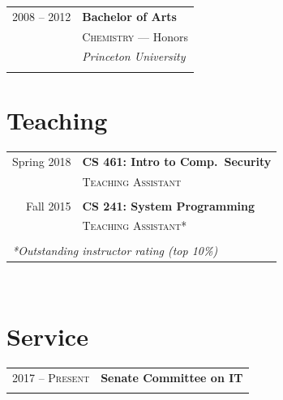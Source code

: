 \documentclass[10pt]{article} %
\begin{document}
{\begin{minipage}[t]{0.44\textwidth}
\begin{tabular}{rl}

2008 -- 2012 & \textbf{Bachelor of Arts} \\ 
& \textsc{Chemistry} --- \small{Honors} \\ 
& \textit{Princeton University}\\
&\\
	  
\end{tabular}


\section{Teaching} 

\begin{tabular}{rl}

Spring 2018	 & \textbf{CS 461: Intro to Comp.\ Security}\\
& \textsc{Teaching Assistant}\\ \\
 

Fall 2015	 & \textbf{CS 241: System Programming}\\
& \textsc{Teaching Assistant*}\\ \\



\multicolumn{2}{l}{\textit{*Outstanding instructor rating (top 10\%)}}
\end{tabular}\\[10pt]


\section{Service} 

\begin{tabular}{rl}
2017 -- \textsc{Present} & \textbf{Senate Committee on IT} \\
& \\


\end{tabular}
\end{minipage}}
\end{document}
